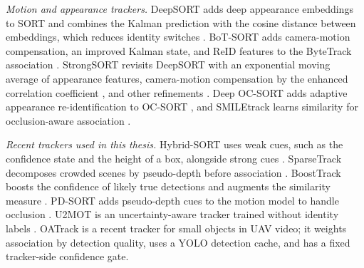 \emph{Motion and appearance trackers.} DeepSORT adds deep appearance embeddings to SORT and combines the Kalman prediction with the cosine distance between embeddings, which reduces identity switches \cite{wojke2017deepsort}. BoT-SORT adds camera-motion compensation, an improved Kalman state, and ReID features to the ByteTrack association \cite{aharon2022botsort}. StrongSORT revisits DeepSORT with an exponential moving average of appearance features, camera-motion compensation by the enhanced correlation coefficient \cite{evangelidis2008ecc}, and other refinements \cite{du2023strongsort}. Deep OC-SORT adds adaptive appearance re-identification to OC-SORT \cite{maggiolino2023deepocsort}, and SMILEtrack learns similarity for occlusion-aware association \cite{wang2024smiletrack}.

\emph{Recent trackers used in this thesis.} Hybrid-SORT uses weak cues, such as the confidence state and the height of a box, alongside strong cues \cite{yang2024hybridsort}. SparseTrack decomposes crowded scenes by pseudo-depth before association \cite{liu2025sparsetrack}. BoostTrack boosts the confidence of likely true detections and augments the similarity measure \cite{stanojevic2024boosttrack}. PD-SORT adds pseudo-depth cues to the motion model to handle occlusion \cite{wang2025pdsort}. U2MOT is an uncertainty-aware tracker trained without identity labels \cite{liu2023u2mot}. OATrack \cite{qi2026oatrack} is a recent tracker for small objects in UAV video; it weights association by detection quality, uses a YOLO detection cache, and has a fixed tracker-side confidence gate.

